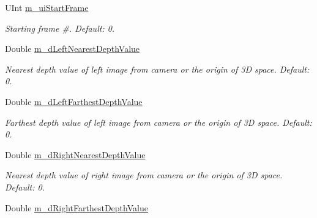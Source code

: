 \begin{DoxyCompactItemize}
\mbox{\label{class_c_parameter_view_interpolation_a8d5713730b3f7271598bf00d986f9efe}} 
U\+Int \hyperlink{class_c_parameter_view_interpolation_a8d5713730b3f7271598bf00d986f9efe}{m\+\_\+ui\+Start\+Frame}
\begin{DoxyCompactList}\small\item\em Starting frame \#. Default\+: 0. \end{DoxyCompactList}\item 
\mbox{\label{class_c_parameter_view_interpolation_afa4540ab1a006b8922471f97d36fb510}} 
Double \hyperlink{class_c_parameter_view_interpolation_afa4540ab1a006b8922471f97d36fb510}{m\+\_\+d\+Left\+Nearest\+Depth\+Value}
\begin{DoxyCompactList}\small\item\em Nearest depth value of left image from camera or the origin of 3D space. Default\+: 0. \end{DoxyCompactList}\item 
\mbox{\label{class_c_parameter_view_interpolation_a3faa42553cfa75f1ea31489d2b35d6f8}} 
Double \hyperlink{class_c_parameter_view_interpolation_a3faa42553cfa75f1ea31489d2b35d6f8}{m\+\_\+d\+Left\+Farthest\+Depth\+Value}
\begin{DoxyCompactList}\small\item\em Farthest depth value of left image from camera or the origin of 3D space. Default\+: 0. \end{DoxyCompactList}\item 
\mbox{\label{class_c_parameter_view_interpolation_a2c89853a0c1a985f02fdc933c11d7e21}} 
Double \hyperlink{class_c_parameter_view_interpolation_a2c89853a0c1a985f02fdc933c11d7e21}{m\+\_\+d\+Right\+Nearest\+Depth\+Value}
\begin{DoxyCompactList}\small\item\em Nearest depth value of right image from camera or the origin of 3D space. Default\+: 0. \end{DoxyCompactList}\item 
\mbox{\label{class_c_parameter_view_interpolation_aa407ffdfeb3ecdbf81523059ac326f44}} 
Double \hyperlink{class_c_parameter_view_interpolation_aa407ffdfeb3ecdbf81523059ac326f44}{m\+\_\+d\+Right\+Farthest\+Depth\+Value}

\end{DoxyCompactItemize}
